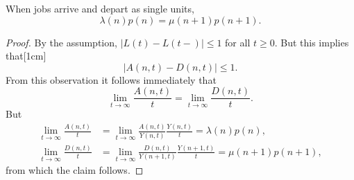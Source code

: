 \documentclass[stochastic-or.tex]{subfiles}
\begin{document}
\begin{theorem}
When  jobs arrive and depart as single units,
\begin{equation}\label{eq:12}
\lambda(n) p(n) = \mu(n+1)p(n+1).
\end{equation}
\begin{marginfigure}%
\end{marginfigure}
\end{theorem}
\begin{proof}
By the assumption, $|L(t) - L(t-)| \leq 1$ for all $t\geq 0$.
But this implies that[1cm]
\begin{equation}\label{eq:97}
|A(n,t) - D(n,t)| \leq 1.
\end{equation}
From this observation it follows immediately that
\begin{equation}\label{eq:15}
 \lim_{t\to\infty} \frac{A(n,t)}t = \lim_{t\to\infty} \frac{D(n,t)}t.
\end{equation}
But
\begin{align*}
\lim_{t\to\infty} \frac{A(n,t)}t &= \lim_{t\to\infty} \frac{A(n,t)}{Y(n,t)}\frac{Y(n,t)}t = \lambda(n) p(n),\\
\lim_{t\to\infty} \frac{D(n,t)}t &= \lim_{t\to\infty} \frac{D(n,t)}{Y(n+1,t)}\frac{Y(n+1,t)}t = \mu(n+1) p(n+1),
\end{align*}
from which the claim follows.
\end{proof}
\end{document}

